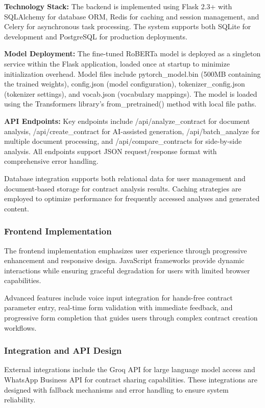 \textbf{Technology Stack:} The backend is implemented using Flask 2.3+ with SQLAlchemy for database ORM, Redis for caching and session management, and Celery for asynchronous task processing. The system supports both SQLite for development and PostgreSQL for production deployments.

\textbf{Model Deployment:} The fine-tuned RoBERTa model is deployed as a singleton service within the Flask application, loaded once at startup to minimize initialization overhead. Model files include pytorch\_model.bin (500MB containing the trained weights), config.json (model configuration), tokenizer\_config.json (tokenizer settings), and vocab.json (vocabulary mappings). The model is loaded using the Transformers library's from\_pretrained() method with local file paths.

\textbf{API Endpoints:} Key endpoints include /api/analyze\_contract for document analysis, /api/create\_contract for AI-assisted generation, /api/batch\_analyze for multiple document processing, and /api/compare\_contracts for side-by-side analysis. All endpoints support JSON request/response format with comprehensive error handling.

Database integration supports both relational data for user management and document-based storage for contract analysis results. Caching strategies are employed to optimize performance for frequently accessed analyses and generated content.

\subsubsection{Frontend Implementation}

The frontend implementation emphasizes user experience through progressive enhancement and responsive design. JavaScript frameworks provide dynamic interactions while ensuring graceful degradation for users with limited browser capabilities.

Advanced features include voice input integration for hands-free contract parameter entry, real-time form validation with immediate feedback, and progressive form completion that guides users through complex contract creation workflows.

\subsubsection{Integration and API Design}

External integrations include the Groq API for large language model access and WhatsApp Business API for contract sharing capabilities. These integrations are designed with fallback mechanisms and error handling to ensure system reliability.


